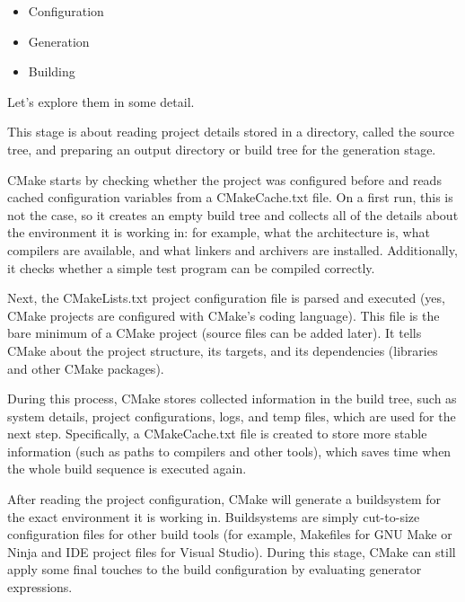 \begin{itemize}
\item
Configuration

\item
Generation

\item
Building
\end{itemize}

Let’s explore them in some detail.


This stage is about reading project details stored in a directory, called the source tree, and preparing an output directory or build tree for the generation stage.

CMake starts by checking whether the project was configured before and reads cached configuration variables from a CMakeCache.txt file. On a first run, this is not the case, so it creates an empty build tree and collects all of the details about the environment it is working in: for example, what the architecture is, what compilers are available, and what linkers and archivers are installed. Additionally, it checks whether a simple test program can be compiled correctly.

Next, the CMakeLists.txt project configuration file is parsed and executed (yes, CMake projects are configured with CMake’s coding language). This file is the bare minimum of a CMake project (source files can be added later). It tells CMake about the project structure, its targets, and its dependencies (libraries and other CMake packages).

During this process, CMake stores collected information in the build tree, such as system details, project configurations, logs, and temp files, which are used for the next step. Specifically, a CMakeCache.txt file is created to store more stable information (such as paths to compilers and other tools), which saves time when the whole build sequence is executed again.


After reading the project configuration, CMake will generate a buildsystem for the exact environment it is working in. Buildsystems are simply cut-to-size configuration files for other build tools (for example, Makefiles for GNU Make or Ninja and IDE project files for Visual Studio). During this stage, CMake can still apply some final touches to the build configuration by evaluating generator expressions.

